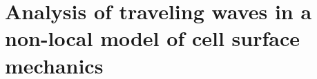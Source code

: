 \renewcommand{\thefootnote}{$\star$} 

\chapter{Analysis of traveling waves in a non-local model of cell surface mechanics}










